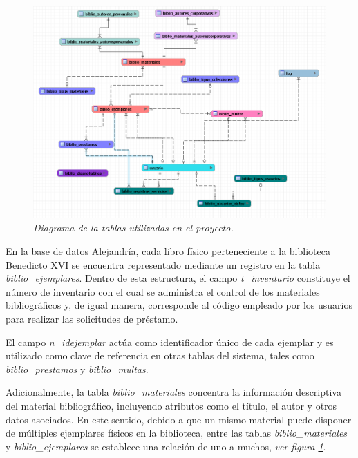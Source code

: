 \documentclass[spanish]{ieee_upb}
\begin{document}
 \begin{figure}[H] 
	\centering
	\includegraphics[width=0.9\linewidth]{img/diagramaEntidadRelacion.png}
	\vspace{-1mm}
	\caption[Diagrama Entidad-Relación]{\textit{Diagrama de la tablas utilizadas en el proyecto.}}
	\label{fig:ERD} 
\end{figure}

En la base de datos Alejandría, cada libro físico perteneciente a la biblioteca Benedicto XVI se encuentra representado mediante un registro en la tabla \textit{biblio\_ejemplares}. Dentro de esta estructura, el campo \textit{t\_inventario} constituye el número de inventario con el cual se administra el control de los materiales bibliográficos y, de igual manera, corresponde al código empleado por los usuarios para realizar las solicitudes de préstamo.
\vspace{0.3 cm}

El campo \textit{n\_idejemplar} actúa como identificador único de cada ejemplar y es utilizado como clave de referencia en otras tablas del sistema, tales como \textit{biblio\_prestamos} y \textit{biblio\_multas}.
\vspace{0.1 cm}

Adicionalmente, la tabla \textit{biblio\_materiales} concentra la información descriptiva del material bibliográfico, incluyendo atributos como el título, el autor y otros datos asociados. En este sentido, debido a que un mismo material puede disponer de múltiples ejemplares físicos en la biblioteca, entre las tablas \textit{biblio\_materiales} y \textit{biblio\_ejemplares} se establece una relación de uno a muchos, \textit{ver figura \ref{fig:ERD}}.
\vspace{0.3 cm}
\end{document}
